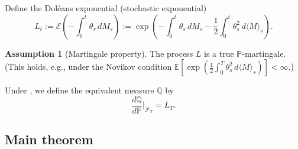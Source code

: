 \documentclass[11pt]{article}
\theoremstyle{plain}
\theoremstyle{definition}
\newtheorem{assumption}{Assumption}[section]
\theoremstyle{remark}
\newcommand{\E}{\mathbb{E}}
\newcommand{\F}{\mathcal{F}}
\newcommand{\PP}{\mathbb{P}}
\newcommand{\QQ}{\mathbb{Q}}
\newcommand{\bracket}[1]{\langle #1 \rangle}
\begin{document}
Define the Dol\'eans exponential (stochastic exponential)
\begin{equation}\label{eq:doleans}
L_t := \mathcal{E}\left(-\int_0^t \theta_s\,dM_s\right)
:= \exp\left(-\int_0^t \theta_s\,dM_s - \frac{1}{2}\int_0^t \theta_s^2\,d\bracket{M}_s\right).
\end{equation}

\begin{assumption}[Martingale property]\label{ass:novikov}
The process $L$ is a true $\PP$-martingale. (This holds, e.g., under the
Novikov condition $\E[\exp(\frac{1}{2}\int_0^T \theta_s^2\,d\bracket{M}_s)] < \infty$.)
\end{assumption}

Under , we define the equivalent measure $\QQ$ by
\begin{equation}\label{eq:Q-def}
\frac{d\QQ}{d\PP}\bigg|_{\F_T} = L_T.
\end{equation}

\subsection{Main theorem}
\end{document}
